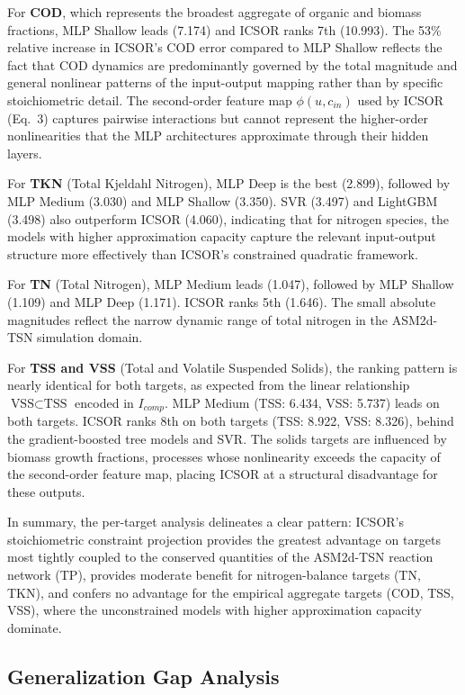 \documentclass[11pt]{article}
\begin{document}
For \textbf{COD}, which represents the broadest aggregate of organic and biomass fractions, MLP Shallow leads (7.174) and ICSOR ranks 7th (10.993). The 53\% relative increase in ICSOR's COD error compared to MLP Shallow reflects the fact that COD dynamics are predominantly governed by the total magnitude and general nonlinear patterns of the input-output mapping rather than by specific stoichiometric detail. The second-order feature map $\phi(u, c_{in})$ used by ICSOR (Eq.~3) captures pairwise interactions but cannot represent the higher-order nonlinearities that the MLP architectures approximate through their hidden layers.

For \textbf{TKN} (Total Kjeldahl Nitrogen), MLP Deep is the best (2.899), followed by MLP Medium (3.030) and MLP Shallow (3.350). SVR (3.497) and LightGBM (3.498) also outperform ICSOR (4.060), indicating that for nitrogen species, the models with higher approximation capacity capture the relevant input-output structure more effectively than ICSOR's constrained quadratic framework.

For \textbf{TN} (Total Nitrogen), MLP Medium leads (1.047), followed by MLP Shallow (1.109) and MLP Deep (1.171). ICSOR ranks 5th (1.646). The small absolute magnitudes reflect the narrow dynamic range of total nitrogen in the ASM2d-TSN simulation domain.

For \textbf{TSS and VSS} (Total and Volatile Suspended Solids), the ranking pattern is nearly identical for both targets, as expected from the linear relationship $\text{VSS} \subset \text{TSS}$ encoded in $I_{comp}$. MLP Medium (TSS: 6.434, VSS: 5.737) leads on both targets. ICSOR ranks 8th on both targets (TSS: 8.922, VSS: 8.326), behind the gradient-boosted tree models and SVR. The solids targets are influenced by biomass growth fractions, processes whose nonlinearity exceeds the capacity of the second-order feature map, placing ICSOR at a structural disadvantage for these outputs.

In summary, the per-target analysis delineates a clear pattern: ICSOR's stoichiometric constraint projection provides the greatest advantage on targets most tightly coupled to the conserved quantities of the ASM2d-TSN reaction network (TP), provides moderate benefit for nitrogen-balance targets (TN, TKN), and confers no advantage for the empirical aggregate targets (COD, TSS, VSS), where the unconstrained models with higher approximation capacity dominate.

\subsection{Generalization Gap Analysis}
\end{document}
